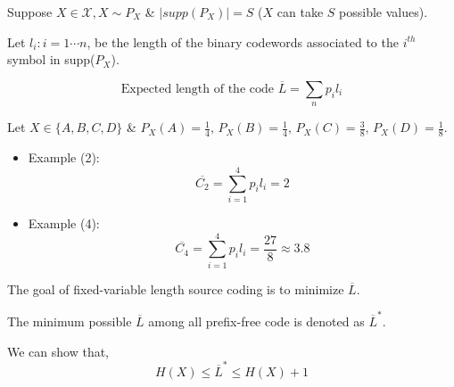 \documentclass{article}
\begin{document}
\begin{enumerate}
Suppose $X \in \mathcal{X}, X \sim P_X$ \& $|supp(P_X)|= S$ ($X$ can take $S$ possible values).

Let $l_i : i= 1\cdots n$, be the length of the binary codewords associated to the $i^{th}$ symbol in supp($P_X$).

$$ \text{Expected length of the code } \overline{L}= \sum_{n} p_i l_i$$

Let $X \in \{ A,B,C,D\} $ \& $P_X(A)= \frac{1}{4},\, P_X(B)= \frac{1}{4},\, P_X(C)= \frac{3}{8},\, P_X(D)= \frac{1}{8}$.
\begin{itemize}
    \item Example (2):
    $$ \overline{C_2}= \sum_{i=1}^{4} p_i l_i=2$$
    \item Example (4):
    $$ \overline{C_4}= \sum_{i=1}^{4} p_i l_i=\frac{27}{8} \approx 3.8$$
\end{itemize}
\end{enumerate}

The goal of fixed-variable length source coding is to minimize $\overline{L}$.

The minimum possible $\overline{L}$ among all prefix-free code is denoted as $\overline{L}^{*}$.

We can show that,
$$ H(X) \leq \overline{L}^{*} \leq H(X)+1$$
\end{document}
